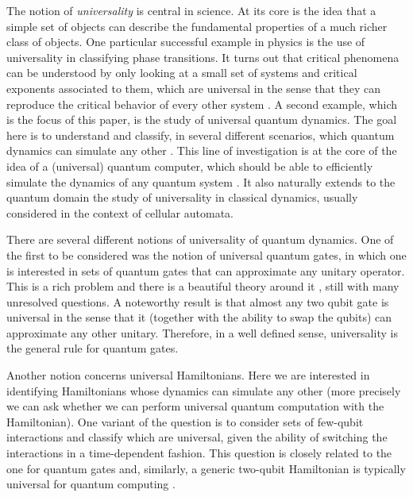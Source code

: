 \documentclass[11pt,letterpaper]{article}
\newcommand{\<}{\langle}
\renewcommand{\>}{\rangle}
\begin{document}
The notion of \textit{universality} is central in science. At its core is the idea that a simple set of objects can describe the fundamental properties of a much richer class of objects. One particular successful example in physics is the use of universality in classifying phase transitions. It turns out that critical phenomena can be understood by only looking at a small set of systems and critical exponents associated to them, which are universal in the sense that they can reproduce the critical behavior of every other system \cite{IsingKad}. A second example, which is the focus of this paper, is the study of universal quantum dynamics. The goal here is to understand and classify, in several different scenarios, which quantum dynamics can simulate any other \cite{cubmont}. This line of investigation is at the core of the idea of a (universal) quantum computer, which should be able to efficiently simulate the dynamics of any quantum system \cite{feynman,deutsch}. It also naturally extends to the quantum domain the study of universality in classical dynamics, usually considered in the context of cellular automata. 

There are several different notions of universality of quantum dynamics. One of the first to be considered was the notion of universal quantum gates, in which one is interested in sets of quantum gates that can approximate any unitary operator. This is a rich problem and there is a beautiful theory around it \cite{KitSol,DN}, still with many unresolved questions. A noteworthy result is that almost any two qubit gate is universal in the sense that it (together with the ability to swap the qubits) can approximate any other unitary. Therefore, in a well defined sense, universality is the general rule for quantum gates. 

Another notion concerns universal Hamiltonians. Here we are interested in identifying Hamiltonians whose dynamics can simulate any other (more precisely we can ask whether we can perform universal quantum computation with the Hamiltonian). One variant of the question is to consider sets of few-qubit interactions and classify which are universal, given the ability of switching the interactions in a time-dependent fashion. This question is closely related to the one for quantum gates and, similarly, a generic two-qubit Hamiltonian is typically universal for quantum computing \cite{childs2010characterization}. 
\end{document}
